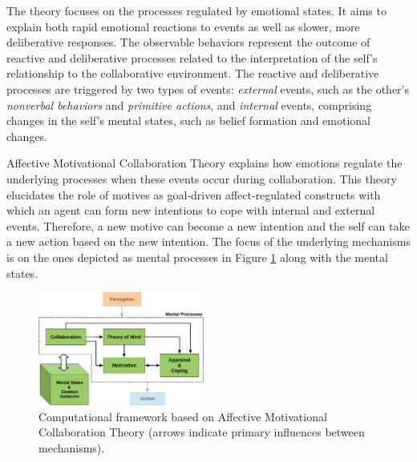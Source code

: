 \documentclass[journal, 11pt]{IEEEtran}
\begin{document}
The theory focuses on the processes regulated by emotional states. It aims to
explain both rapid emotional reactions to events as well as slower, more
deliberative responses. The observable behaviors represent the outcome of
reactive and deliberative processes related to the interpretation of the self's
relationship to the collaborative environment. The reactive and deliberative
processes are triggered by two types of events: \textit{external} events, such
as the other's \textit{nonverbal behaviors} and \textit{primitive actions}, and
\textit{internal} events, comprising changes in the self's mental states, such
as belief formation and emotional changes.

Affective Motivational Collaboration Theory explains how emotions regulate the
underlying processes when these events occur during collaboration. This theory
elucidates the role of motives as goal-driven affect-regulated constructs with
which an agent can form new intentions to cope with internal and external
events. Therefore, a new motive can become a new intention and the self can take
a new action based on the new intention.  The focus of the underlying mechanisms
is on the ones depicted as mental processes in Figure \ref{fig:cpm} along with
the mental states.

\begin{figure}[!t]
  \centering
  \includegraphics[width=0.485\textwidth]{figs/theory-general-croped.pdf}
  \caption{{\fontsize{10}{10}\selectfont Computational framework based on
  Affective Motivational Collaboration Theory (arrows indicate primary
  influences between mechanisms).}}
  \label{fig:cpm}
\end{figure}
\end{document}
